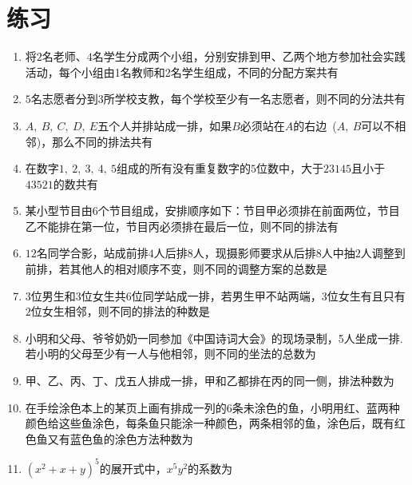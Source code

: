 \documentclass{BHCexam}
\begin{document}
\section{练习}
\begin{enumerate}[1.]

\item 将$2$名老师、$4$名学生分成两个小组，分别安排到甲、乙两个地方参加社会实践活动，每个小组由1名教师和2名学生组成，不同的分配方案共有\xx
{}

\item $5$名志愿者分到$ 3 $所学校支教，每个学校至少有一名志愿者，则不同的分法共有\xx
{}

\item $A,~B,~C,~D,~E$五个人并排站成一排，如果$ B $必须站在$ A $的右边~($A,~B$可以不相邻)，那么不同的排法共有\xx
{}
\item 在数字$ 1,~2,~3,~4,~5 $组成的所有没有重复数字的$ 5 $位数中，大于$ 23145 $且小于$ 43521 $的数共有\xx
{}
\item 某小型节目由$6$个节目组成，安排顺序如下：节目甲必须排在前面两位，节目乙不能排在第一位，节目丙必须排在最后一位，则不同的排法有\xx
{}
\item $12$名同学合影，站成前排$ 4 $人后排$ 8 $人，现摄影师要求从后排$ 8 $人中抽$ 2 $人调整到前排，若其他人的相对顺序不变，则不同的调整方案的总数是\xx
{}
\item $ 3 $位男生和$ 3 $位女生共$ 6 $位同学站成一排，若男生甲不站两端，$ 3 $位女生有且只有$ 2 $位女生相邻，则不同的排法的种数是\xx
{}
\item 小明和父母、爷爷奶奶一同参加《中国诗词大会》的现场录制，5人坐成一排.若小明的父母至少有一人与他相邻，则不同的坐法的总数为\xx
{}
\item 甲、乙、丙、丁、戊五人排成一排，甲和乙都排在丙的同一侧，排法种数为\xx
{}
\item 在手绘涂色本上的某页上画有排成一列的$ 6 $条未涂色的鱼，小明用红、蓝两种颜色给这些鱼涂色，每条鱼只能涂一种颜色，两条相邻的鱼，涂色后，既有红色鱼又有蓝色鱼的涂色方法种数为\xx
{}

\item $ \left(x^2+x+y\right)^5 $的展开式中，$ x^5y^2 $的系数为\xx
{}


\end{enumerate}
\end{document}
